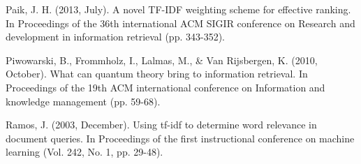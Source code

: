 \documentclass{llncs}
\begin{document}
\begin{thebibliography}{}
Paik, J. H. (2013, July). A novel TF-IDF weighting scheme for effective
ranking. In Proceedings of the 36th international ACM SIGIR conference on
Research and development in information retrieval (pp. 343-352).

 Piwowarski, B., Frommholz, I., Lalmas, M., \& Van
Rijsbergen, K. (2010, October). What can quantum theory bring to information
retrieval. In Proceedings of the 19th ACM international conference on
Information and knowledge management (pp. 59-68).

Ramos, J. (2003, December). Using tf-idf to determine word relevance in
document queries. In Proceedings of the first instructional conference on
machine learning (Vol. 242, No. 1, pp. 29-48).

\end{thebibliography}
\clearpage
{} %
\renewcommand{\indexname}{Subject Index}

\end{document}
